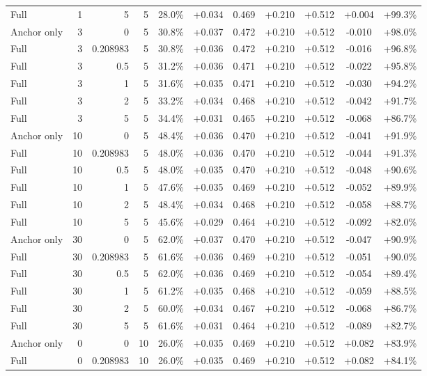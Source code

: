 \begin{table}[htbp]
\begin{tabular}{lrrrccccccc}
Full & 1 & 5 & 5 & 28.0\% & +0.034 & 0.469 & +0.210 & +0.512 & +0.004 & +99.3\% \\
Anchor only & 3 & 0 & 5 & 30.8\% & +0.037 & 0.472 & +0.210 & +0.512 & -0.010 & +98.0\% \\
Full & 3 & 0.208983 & 5 & 30.8\% & +0.036 & 0.472 & +0.210 & +0.512 & -0.016 & +96.8\% \\
Full & 3 & 0.5 & 5 & 31.2\% & +0.036 & 0.471 & +0.210 & +0.512 & -0.022 & +95.8\% \\
Full & 3 & 1 & 5 & 31.6\% & +0.035 & 0.471 & +0.210 & +0.512 & -0.030 & +94.2\% \\
Full & 3 & 2 & 5 & 33.2\% & +0.034 & 0.468 & +0.210 & +0.512 & -0.042 & +91.7\% \\
Full & 3 & 5 & 5 & 34.4\% & +0.031 & 0.465 & +0.210 & +0.512 & -0.068 & +86.7\% \\
Anchor only & 10 & 0 & 5 & 48.4\% & +0.036 & 0.470 & +0.210 & +0.512 & -0.041 & +91.9\% \\
Full & 10 & 0.208983 & 5 & 48.0\% & +0.036 & 0.470 & +0.210 & +0.512 & -0.044 & +91.3\% \\
Full & 10 & 0.5 & 5 & 48.0\% & +0.035 & 0.470 & +0.210 & +0.512 & -0.048 & +90.6\% \\
Full & 10 & 1 & 5 & 47.6\% & +0.035 & 0.469 & +0.210 & +0.512 & -0.052 & +89.9\% \\
Full & 10 & 2 & 5 & 48.4\% & +0.034 & 0.468 & +0.210 & +0.512 & -0.058 & +88.7\% \\
Full & 10 & 5 & 5 & 45.6\% & +0.029 & 0.464 & +0.210 & +0.512 & -0.092 & +82.0\% \\
Anchor only & 30 & 0 & 5 & 62.0\% & +0.037 & 0.470 & +0.210 & +0.512 & -0.047 & +90.9\% \\
Full & 30 & 0.208983 & 5 & 61.6\% & +0.036 & 0.469 & +0.210 & +0.512 & -0.051 & +90.0\% \\
Full & 30 & 0.5 & 5 & 62.0\% & +0.036 & 0.469 & +0.210 & +0.512 & -0.054 & +89.4\% \\
Full & 30 & 1 & 5 & 61.2\% & +0.035 & 0.468 & +0.210 & +0.512 & -0.059 & +88.5\% \\
Full & 30 & 2 & 5 & 60.0\% & +0.034 & 0.467 & +0.210 & +0.512 & -0.068 & +86.7\% \\
Full & 30 & 5 & 5 & 61.6\% & +0.031 & 0.464 & +0.210 & +0.512 & -0.089 & +82.7\% \\
Anchor only & 0 & 0 & 10 & 26.0\% & +0.035 & 0.469 & +0.210 & +0.512 & +0.082 & +83.9\% \\
Full & 0 & 0.208983 & 10 & 26.0\% & +0.035 & 0.469 & +0.210 & +0.512 & +0.082 & +84.1\% \\

\end{tabular}
\end{table}
